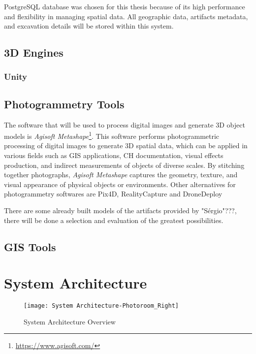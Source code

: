 PostgreSQL database was chosen for this thesis because of its high performance and flexibility in managing spatial data. All geographic data, artifacts metadata, and excavation details will be stored within this system.


\subsection{3D Engines}
\label{sec:vr_tools} 

\subsubsection{Unity}
\label{sec:unity_description} 

\subsection{Photogrammetry Tools}
\label{sec:photogrammetry_tool} 

The software that will be used to process digital images and generate \gls{3D} object models is \textit{Agisoft Metashape}\footnote{\url{https://www.agisoft.com/}}.
This software performs photogrammetric processing of digital images to generate \gls{3D} spatial data, which can be applied in various fields such as \gls{GIS} applications, \gls{CH} documentation, visual effects production, and indirect measurements of objects of diverse scales. 
By stitching together photographs, \textit{Agisoft Metashape} captures the geometry, texture, and visual appearance of physical objects or environments.
Other alternatives for photogrammetry softwares are Pix4D, RealityCapture and DroneDeploy

There are some already built models of the artifacts provided by "Sérgio"???, there will be done a selection and evaluation of the greatest possibilities.

\subsection{GIS Tools}
\label{sec:gis} 


\section{System Architecture}
\label{sec:architecture}


\begin{figure}[h!]
    \centering
    \texttt{[image: System Architecture-Photoroom\_Right]}
    \caption{System Architecture Overview}
    \label{fig:architecture}
  \end{figure}
  \FloatBarrier


